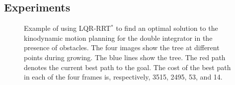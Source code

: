 \documentclass[letterpaper, 10pt, english, conference]{IEEEtran}
\begin{document}
\subsection{Experiments}

\begin{figure}
\begin{center}
  \begin{center}
  \end{center}
\end{center}
\caption{Example of using LQR-RRT$^*$ to find an optimal solution to
  the kinodynamic motion planning for the double integrator in the
  presence of obstacles. The four images show the tree at different
  points during growing. The blue lines show the tree. The red path
  denotes the current best path to the goal. The cost of the best path
  in each of the four frames is, respectively, 3515, 2495, 53, and
  14.}
\label{fig:linear_case_study}
\end{figure}
\end{document}
